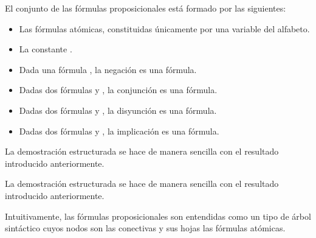 \begin{isabellebody}
\begin{isamarkuptext}
  \begin{definicion}
    El conjunto de las fórmulas proposicionales está formado por las 
    siguientes:
    \begin{itemize}
      \item Las fórmulas atómicas, constituidas únicamente por una 
        variable del alfabeto. 
      \item La constante \isa{{\isasymbottom}}.
      \item Dada una fórmula , la negación  es una fórmula.
      \item Dadas dos fórmulas  y , la conjunción  es una
        fórmula.
      \item Dadas dos fórmulas  y , la disyunción  es una
        fórmula.
      \item Dadas dos fórmulas  y , la implicación  es 
        una fórmula.
    \end{itemize}
  La demostración estructurada se hace de manera sencilla con el 
  resultado introducido anteriormente. 

  La demostración estructurada se hace de manera sencilla con el 
  resultado introducido anteriormente. 

  \end{definicion}

  Intuitivamente, las fórmulas proposicionales son entendidas como un 
  tipo de árbol sintáctico cuyos nodos son las conectivas y sus hojas
  las fórmulas atómicas.



\end{isamarkuptext}
\end{isabellebody}
